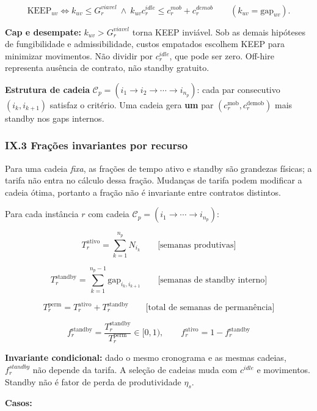 \documentclass[
  10pt,
]{article}
\begin{document}
\[\boxed{\mathrm{KEEP}_{uv}\iff k_{uv}\le G_r^{viavel}\ \land\ k_{uv}c_r^{idle}\le c_r^{mob}+c_r^{demob}}\qquad(k_{uv}=\mathrm{gap}_{uv}).\]

\textbf{Cap e desempate:} \(k_{uv}>G_r^{viavel}\) torna KEEP inviável. Sob as demais hipóteses de fungibilidade e admissibilidade, custos empatados escolhem KEEP para minimizar movimentos. Não dividir por \(c_r^{idle}\), que pode ser zero. Off-hire representa ausência de contrato, não standby gratuito.

\textbf{Estrutura de cadeia}
\(\mathcal{C}_p = (i_1 \to i_2 \to \cdots \to i_{n_p})\): cada par
consecutivo \((i_k, i_{k+1})\) satisfaz o critério. Uma cadeia gera
\textbf{um} par \((c_r^{\text{mob}}, c_r^{\text{demob}})\) mais standby
nos gaps internos.

\hypertarget{ix.3-frauxe7uxf5es-invariantes-por-recurso}{%
\subsubsection{IX.3 Frações invariantes por
recurso}\label{ix.3-frauxe7uxf5es-invariantes-por-recurso}}

Para uma cadeia \emph{fixa}, as frações de tempo ativo e standby são grandezas físicas; a tarifa não entra no cálculo dessa fração. Mudanças de tarifa podem modificar a cadeia ótima, portanto a fração não é invariante entre contratos distintos.

Para cada instância \(r\) com cadeia
\(\mathcal{C}_p = (i_1 \to \cdots \to i_{n_p})\):

\[T_r^{\text{ativo}} = \sum_{k=1}^{n_p} N_{i_k} \qquad\text{[semanas produtivas]}\]

\[T_r^{\text{standby}} = \sum_{k=1}^{n_p-1} \text{gap}_{i_k,i_{k+1}} \qquad\text{[semanas de standby interno]}\]

\[T_r^{\text{perm}} = T_r^{\text{ativo}} + T_r^{\text{standby}} \qquad\text{[total de semanas de permanência]}\]

\[\boxed{f_r^{\text{standby}} = \frac{T_r^{\text{standby}}}{T_r^{\text{perm}}} \in [0,1), \qquad f_r^{\text{ativo}} = 1 - f_r^{\text{standby}}}\]

\textbf{Invariante condicional:} dado o mesmo cronograma e as mesmas cadeias, \(f_r^{standby}\) não depende da tarifa. A seleção de cadeias muda com \(c^{idle}\) e movimentos. Standby não é fator de perda de produtividade \(\eta_s\).

\textbf{Casos:}
\end{document}
